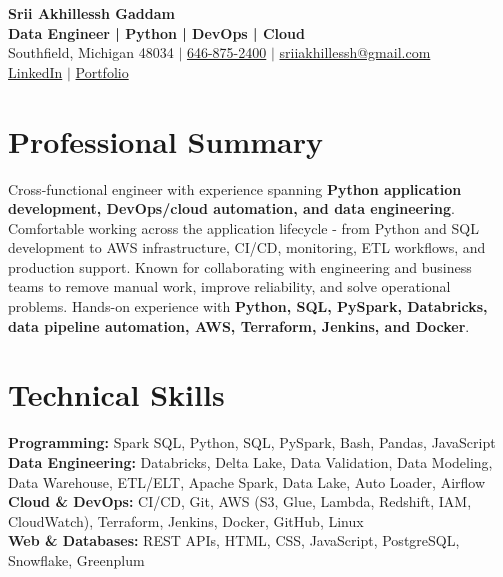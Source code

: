 \documentclass[letterpaper,10pt]{article}
\begin{document}
\fontsize{9.35pt}{10.45pt}\selectfont

\begin{center}
    {\LARGE \textbf{Srii Akhillessh Gaddam}} \\[-1pt]
    \textbf{Data Engineer | Python | DevOps | Cloud} \\[2pt]
    Southfield, Michigan 48034 $|$
    \href{tel:6468752400}{646-875-2400} $|$
    \href{mailto:sriiakhillessh@gmail.com}{sriiakhillessh@gmail.com} \\[1pt]
    \href{https://www.linkedin.com/in/srii-akhiilessh-gaddam-b48668191/}{LinkedIn} $|$
    \href{https://sriiakhillesshg.github.io/portfolio/}{Portfolio}
\end{center}
\vspace{-8pt}

\section{Professional Summary}
\small{Cross-functional engineer with experience spanning \textbf{Python application development, DevOps/cloud automation, and data engineering}. Comfortable working across the application lifecycle - from Python and SQL development to AWS infrastructure, CI/CD, monitoring, ETL workflows, and production support. Known for collaborating with engineering and business teams to remove manual work, improve reliability, and solve operational problems. Hands-on experience with \textbf{Python, SQL, PySpark, Databricks, data pipeline automation, AWS, Terraform, Jenkins, and Docker}.}

\section{Technical Skills}
\small{
\textbf{Programming:} Spark SQL, Python, SQL, PySpark, Bash, Pandas, JavaScript \\
\textbf{Data Engineering:} Databricks, Delta Lake, Data Validation, Data Modeling, Data Warehouse, ETL/ELT, Apache Spark, Data Lake, Auto Loader, Airflow \\
\textbf{Cloud \& DevOps:} CI/CD, Git, AWS (S3, Glue, Lambda, Redshift, IAM, CloudWatch), Terraform, Jenkins, Docker, GitHub, Linux \\
\textbf{Web \& Databases:} REST APIs, HTML, CSS, JavaScript, PostgreSQL, Snowflake, Greenplum
}
\end{document}
